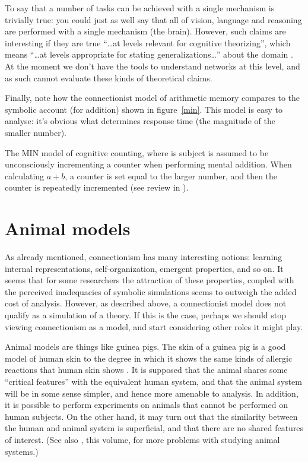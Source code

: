 To say that a number of tasks can be achieved with a single mechanism is
trivially true: you could just as well say that all of vision, language and
reasoning are performed with a single mechanism (the brain).  However, such
claims are interesting if they are true ``\ldots at levels relevant for
cognitive theorizing'', which means ``\ldots at levels appropriate for
stating generalizations\ldots'' about the domain \cite[p.~391]{mcclnetw}.
At the moment we don't have the tools to understand networks at this level,
and as such cannot evaluate these kinds of theoretical claims.

Finally, note how the connectionist model of arithmetic memory compares to
the symbolic account (for
addition) shown in figure~\ref{min}. This model is
easy to analyse: it's obvious what determines response time (the
magnitude of the smaller number).

\begin{fancyfigure}\smallskip
\centerline{}
\caption{The MIN model of cognitive counting, where is subject is assumed
to be unconsciously incrementing a counter when performing mental
addition.  When calculating $a+b$, a counter is set equal to the larger
number, and then the counter is repeatedly incremented
(see review in \protect{}).}
\label{min}
\end{fancyfigure}


\section*{Animal models}

As already mentioned, connectionism has many interesting notions: learning
internal representations, self-organization, emergent properties, and so
on. It seems that for some researchers the attraction of these properties,
coupled with the perceived inadequacies of symbolic simulations
seems to outweigh the added cost of analysis.
However, as described above, a connectionist model does not qualify as a
simulation of a theory.
If this
is the case, perhaps we should stop viewing connectionism as a model, and
start considering other roles it might play.

Animal models are things like guinea pigs. The skin of a guinea pig is a
good model of human skin to the degree in which it shows the same kinds of
allergic reactions that human skin shows \cite{bothwhy}. It is supposed
that the animal shares some ``critical features'' with the equivalent human
system, and that the animal system will be in some sense simpler, and hence
more amenable to analysis.  In addition, it is possible to perform
experiments on animals that cannot be performed on human subjects.  On the
other hand, it may turn out that the similarity between the human and
animal system is superficial, and that there are no shared features of
interest. (See also \citeauthor{hendcuri}, this volume, for more problems
with studying animal systems.)


